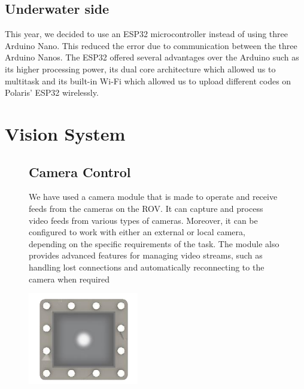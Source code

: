 \documentclass[a4paper,10pt]{article}
\begin{document}
	\subsection{Underwater side}
		This year, we decided to use an ESP32 microcontroller instead of using three Arduino Nano. 
		This reduced the error due to communication between the three Arduino Nanos. The ESP32 
		offered several advantages over the Arduino such as its higher processing power, its dual core 
		architecture which allowed us to multitask and its built-in Wi-Fi which allowed us to upload 
		different codes on Polaris’ ESP32 wirelessly.
	
	\section{Vision System}
	\begin{figure}[H]
		\begin{minipage}{0.7\textwidth}
			\subsection*{Camera Control}
			We have used a camera module that is made to operate and receive feeds 
			from the cameras on the ROV. It can capture and process video feeds from 
			various types of cameras. Moreover, it can be configured to work with either 
			an external or local camera, depending on the specific requirements of the 
			task. The module also provides advanced features for managing video 
			streams, such as handling lost connections and automatically 
			reconnecting to the camera when required
		\end{minipage}
		\hfill
		\begin{minipage}{0.2\textwidth}
			\centering
			\includegraphics[width=\textwidth]{main_camera}
		\end{minipage}
		
		
		
	\end{figure}
	
	
	
\end{document}
